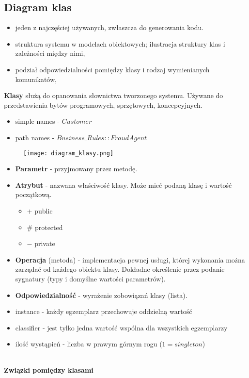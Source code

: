 \documentclass[a4paper]{article}
\begin{document}
    \subsection{Diagram klas}
    \begin{itemize}
        \item jeden z najczęściej używanych, zwłaszcza do generowania kodu.
        \item struktura systemu w modelach obiektowych; ilustracja
        struktury klas i zależności między nimi,
        \item podział odpowiedzialności pomiędzy klasy i
        rodzaj wymienianych komunikatów,
    \end{itemize}

    \textbf{Klasy} służą do opanowania słownictwa tworzonego systemu. Używane do przedstawienia bytów programowych, sprzętowych,
    koncepcyjnych.
    \begin{itemize}
        \item simple names - $Customer$
        \item path names - $Business\_Rules::FraudAgent$
    \end{itemize}

    \begin{figure}[H]
        \texttt{[image: diagram\_klasy.png]}
    \end{figure}

    \begin{itemize}
        \item \textbf{Parametr} - przyjmowany przez metodę.
        \item \textbf{Atrybut} - nazwana właściwość klasy. Może mieć podaną klasę i wartość początkową.
        \begin{itemize}
            \item $+$  public
            \item \# protected
            \item $-$ private
        \end{itemize}
        \item \textbf{Operacja} (metoda) - implementacja pewnej usługi, której wykonania można zarządać
        od każdego obiektu klasy. Dokładne określenie przez podanie sygnatury (typy i domyślne wartości parametrów).
        \item \textbf{Odpowiedzialność} - wyrażenie zobowiązań klasy (lista).

        \item instance - każdy egzemplarz przechowuje oddzielną wartość
        \item classifier - jest tylko jedna wartość wspólna dla wszystkich egzemplarzy
        \item ilość wystąpień - liczba w prawym górnym rogu ($1 = singleton$)
    \end{itemize}
    \hfill \\
    \textbf{Związki pomiędzy klasami}
\end{document}
